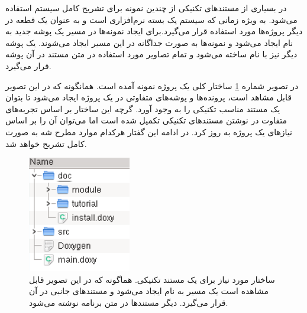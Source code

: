   در بسیاری از مستندهای تکنیکی از چندین نمونه برای تشریح کامل سیستم استفاده
  می‌شود. به ویژه زمانی که سیستم یک بسته نرم‌افزاری است و به عنوان یک قطعه در
  دیگر پروژه‌ها مورد استفاده قرار می‌گیرد.برای ایجاد نمونه‌ها در مسیر 
  یک پوشه جدید به نام  ایجاد می‌شود و نمونه‌ها به صورت جداگانه در
  این مسیر ایجاد می‌شوند. یک پوشه دیگر نیز با نام  ساخته می‌شود و تمام 
  تصاویر مورد استفاده در متن مستند در آن پوشه قرار می‌گیرد.
  
  در تصویر شماره \ref{standard/where-what/doc-struct} ساختار کلی یک پروژه نمونه آمده است.
  همانگونه که در این تصویر قابل مشاهد است، پرونده‌ها و پوشه‌های متفاوتی در یک
  پروژه ایجاد می‌شود تا بتوان یک مستند مناسب تکنیکی را به وجود آورد. گرچه این
  ساختار بر اساس تجربه‌های متفاوت در نوشتن مستندهای تکنیکی تکمیل شده است اما
  می‌توان آن را بر اساس نیازهای یک پروژه به روز کرد. در ادامه این گفتار هرکدام
  موارد مطرح شه به صورت کامل تشریح خواهد شد.
  \begin{figure}
    \centering
    \includegraphics[width=0.4\textwidth]{image/doc-struct}
    \caption[ساختار مورد نیاز برای ایجاد مستند تکنیکی]
    {
      ساختار مورد نیاز برای یک مستند تکنیکی. هماگونه که در این تصویر قابل مشاهده
      است یک مسیر به نام  ایجاد می‌شود و مستندهای جانبی در آن قرار
      می‌گیرد. دیگر مستندها در متن برنامه نوشته می‌شود.
    }
    \label{standard/where-what/doc-struct}
  \end{figure}






